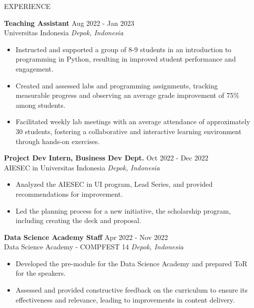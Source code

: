 \documentclass{resume} %
\begin{document}
\begin{rSection}{EXPERIENCE}

\textbf{Teaching Assistant} \hfill Aug 2022 - Jan 2023 \\
Universitas Indonesia \hfill \textit{Depok, Indonesia}
\vspace{-0.75em}
\begin{itemize}
\itemsep -7pt {}
\item Instructed and supported a group of 8-9 students in an introduction to programming in Python, resulting in improved student performance and engagement.
\item Created and assessed labs and programming assignments, tracking measurable progress and observing an average grade improvement of 75\% among students.
\item Facilitated weekly lab meetings with an average attendance of approximately 30 students, fostering a collaborative and interactive learning environment through hands-on exercises.
 \end{itemize}
 \vspace{-0.5em}

\textbf{Project Dev Intern, Business Dev Dept.} \hfill Oct 2022 - Dec 2022 \\
AIESEC in Universitas Indonesia \hfill \textit{Depok, Indonesia}
\vspace{-0.75em}
\begin{itemize}
\itemsep -7pt {}
\item Analyzed the AIESEC in UI program, Lead Series, and provided recommendations for improvement.
\item Led the planning process for a new initiative, the scholarship program, including creating the deck and proposal.
 \end{itemize}
 \vspace{-0.5em}

\textbf{Data Science Academy Staff} \hfill Apr 2022 - Nov 2022 \\
Data Science Academy - COMPFEST 14 \hfill \textit{Depok, Indonesia}
\vspace{-0.75em}
\begin{itemize}
\itemsep -7pt {}
\item Developed the pre-module for the Data Science Academy and prepared ToR for the speakers.
\item Assessed and provided constructive feedback on the curriculum to ensure its effectiveness and relevance, leading to improvements in content delivery.
 \end{itemize}
 \vspace{-0.5em}


\end{rSection} 
\end{document}
